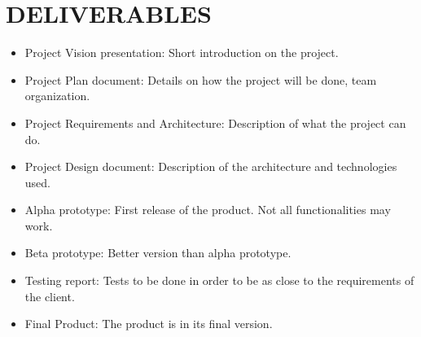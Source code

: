 \section{DELIVERABLES}
\begin{itemize}
	\item Project Vision presentation: Short introduction on the project.
	\item Project Plan document: Details on how the project will be done, team organization.
	\item Project Requirements and Architecture: Description of what the project can do.
	\item Project Design document: Description of the architecture and technologies used.
	\item Alpha prototype: First release of the product. Not all functionalities may work.
	\item Beta prototype: Better version than alpha prototype.
	\item Testing report: Tests to be done in order to be as close to the requirements of the client.
	\item Final Product: The product is in its final version.	
\end{itemize}